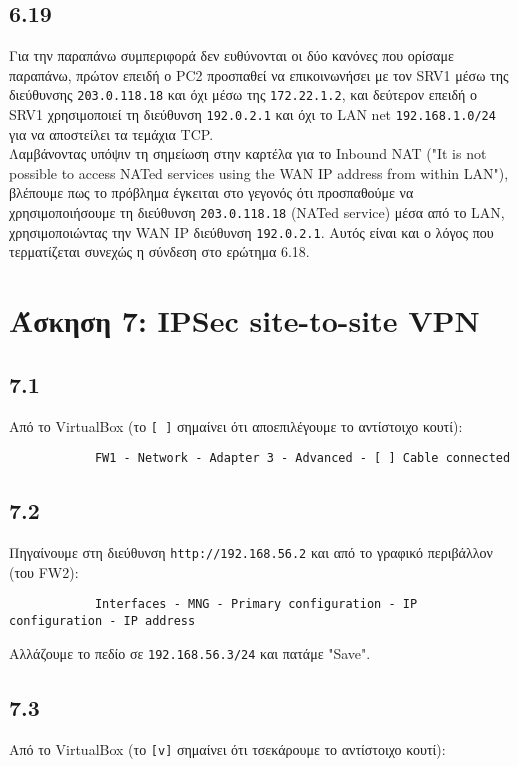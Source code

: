 \documentclass[a4paper, 12pt]{article}
\begin{document}
	\subsection*{6.19}
		Για την παραπάνω συμπεριφορά δεν ευθύνονται οι δύο κανόνες που ορίσαμε παραπάνω, πρώτον επειδή ο PC2 προσπαθεί να επικοινωνήσει με τον SRV1 μέσω της διεύθυνσης \verb|203.0.118.18| και όχι μέσω της \verb|172.22.1.2|, και δεύτερον επειδή ο SRV1 χρησιμοποιεί τη διεύθυνση \verb|192.0.2.1| και όχι το LAN net \verb|192.168.1.0/24| για να αποστείλει τα τεμάχια TCP. \\
		
		Λαμβάνοντας υπόψιν τη σημείωση στην καρτέλα για το Inbound NAT ("It is not possible to access NATed services using the WAN IP address from within LAN"), βλέπουμε πως το πρόβλημα έγκειται στο γεγονός ότι προσπαθούμε να χρησιμοποιήσουμε τη διεύθυνση \verb|203.0.118.18| (NATed service) μέσα από το LAN, χρησιμοποιώντας την WAN IP διεύθυνση \verb|192.0.2.1|. Αυτός είναι και ο λόγος που τερματίζεται συνεχώς η σύνδεση στο ερώτημα 6.18. 

\section*{Άσκηση 7: IPSec site-to-site VPN}	

	\subsection*{7.1}
		Από το VirtualBox (το \verb|[ ]| σημαίνει ότι αποεπιλέγουμε το αντίστοιχο κουτί):
		
		\begin{verbatim}
			FW1 - Network - Adapter 3 - Advanced - [ ] Cable connected
		\end{verbatim}

	\subsection*{7.2}
		Πηγαίνουμε στη διεύθυνση \verb|http://192.168.56.2| και από το γραφικό περιβάλλον (του FW2):
		
		\begin{verbatim}
			Interfaces - MNG - Primary configuration - IP configuration - IP address 
		\end{verbatim}
		
		Αλλάζουμε το πεδίο σε \verb|192.168.56.3/24| και πατάμε "Save".

	\subsection*{7.3}
		Από το VirtualBox (το \verb|[v]| σημαίνει ότι τσεκάρουμε το αντίστοιχο κουτί):
		
\end{document}
